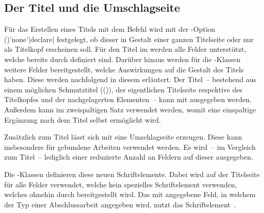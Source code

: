 \begin{Declaration*}{}
\begin{Declaration*}{}
\begin{Declaration*}{}
\subsection{Der Titel und die Umschlagseite}
%
%
%
%
%
Für das Erstellen eines Titels mit dem Befehl  wird mit der 
\KOMAScript-Option 
()'none'|declare| 
festgelegt, ob dieser in Gestalt einer ganzen Titelseite oder nur als Titelkopf 
erscheinen soll. Für den Titel im \TUDCD werden alle Felder unterstützt, welche 
bereits durch \KOMAScript{} definiert sind. Darüber hinaus werden für die 
\TUDScript-Klassen weitere Felder bereitgestellt, welche Auswirkungen auf die 
Gestalt des Titels haben. Diese werden nachfolgend in diesem \autorefname 
erläutert. Der Titel~-- bestehend aus einem möglichen Schmutztitel 
(()), der eigentlichen Titelseite 
respektive des Titelkopfes und der nachgelagerten Elementen~-- kann mit 
 ausgegeben werden. Außerdem kann im zweispaltigen Satz 
 verwendet werden, womit eine einspaltige Ergänzung 
nach dem Titel selbst ermöglicht wird.

Zusätzlich zum Titel lässt sich mit  eine Umschlagseite 
erzeugen. Diese kann insbesondere für gebundene Arbeiten verwendet werden. Es 
wird~-- im Vergleich zum Titel~-- lediglich einer reduzierte Anzahl an Feldern 
auf dieser ausgegeben.

\begin{Declaration}[v2.02]{}
\begin{Declaration}[v2.02]{}
\printdeclarationlist%
%
%
Die \TUDScript-Klassen definieren diese neuen Schriftelemente. Dabei wird 
 auf der Titelseite für alle Felder verwendet, welche kein 
spezielles Schriftelement verwenden, welches ohnehin durch \KOMAScript{} 
bereitgestellt wird. Das mit  angegebene Feld, in welchem der Typ 
einer Abschlussarbeit angegeben wird, nutzt das Schriftelement~. 


\end{Declaration}
\end{Declaration}
\end{Declaration*}
\end{Declaration*}
\end{Declaration*}
